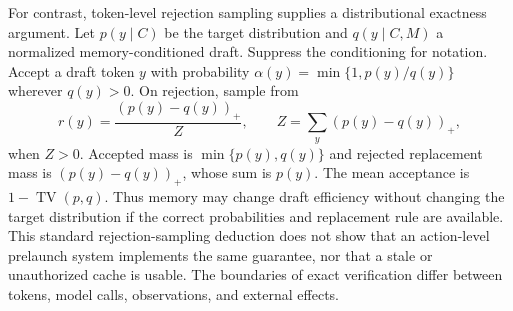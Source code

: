 For contrast, token-level rejection sampling supplies a distributional exactness argument. Let $p(y\mid C)$ be the target distribution and $q(y\mid C,M)$ a normalized memory-conditioned draft. Suppress the conditioning for notation. Accept a draft token $y$ with probability $\alpha(y)=\min\{1,p(y)/q(y)\}$ wherever $q(y)>0$. On rejection, sample from
\begin{equation}
 r(y)=\frac{(p(y)-q(y))_+}{Z},\qquad
 Z=\sum_y(p(y)-q(y))_+,
\end{equation}
when $Z>0$. Accepted mass is $\min\{p(y),q(y)\}$ and rejected replacement mass is $(p(y)-q(y))_+$, whose sum is $p(y)$. The mean acceptance is $1-\operatorname{TV}(p,q)$. Thus memory may change draft efficiency without changing the target distribution if the correct probabilities and replacement rule are available. This standard rejection-sampling deduction does not show that an action-level prelaunch system implements the same guarantee, nor that a stale or unauthorized cache is usable. The boundaries of exact verification differ between tokens, model calls, observations, and external effects.

